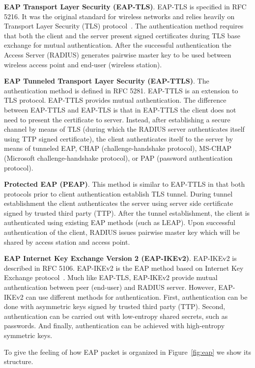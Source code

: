 \textbf{EAP Transport Layer Security (EAP-TLS)}. EAP-TLS is specified in RFC 5216. It was the original standard for wireless networks and relies heavily on Transport Layer Security (TLS) protocol~\cite{tls}. The authentication method requires that both the client and the server present signed certificates during TLS base exchange for mutual authentication. After the successful authentication the Access Server (RADIUS) generates pairwise master key to be used between wireless access point and end-user (wireless station).

\textbf{EAP Tunneled Transport Layer Security (EAP-TTLS)}. The authentication method is defined in RFC 5281. EAP-TTLS is an extension to TLS protocol. EAP-TTLS provides mutual authentication. The difference between EAP-TTLS and EAP-TLS is that in EAP-TTLS the client does not need to present the certificate to server. Instead, after establishing a secure channel by means of TLS (during which the RADIUS server authenticates itself using TTP signed certificate), the client authenticates itself to the server by means of tunneled EAP, CHAP (challenge-handshake protocol), MS-CHAP (Microsoft challenge-handshake protocol), or PAP (password authentication protocol).

\textbf{Protected EAP (PEAP)}. This method is similar to EAP-TTLS in that both protocols prior to client authentication establish TLS tunnel. During tunnel establishment the client authenticates the server using server side certificate signed by trusted third party (TTP). After the tunnel establishment, the client is authenticated using existing EAP methods (such as LEAP). Upon successful authentication of the client, RADIUS issues pairwise master key which will be shared by access station and access point.

\textbf{EAP Internet Key Exchange Version 2 (EAP-IKEv2)}. EAP-IKEv2 is described in RFC 5106. EAP-IKEv2 is the EAP method based on Internet Key Exchange protocol~\cite{}. Much like EAP-TLS, EAP-IKEv2 provide mutual authentication between peer (end-user) and RADIUS server. However, EAP-IKEv2 can use different methods for authentication. First, authentication can be done with asymmetric keys signed by trusted third party (TTP). Second, authentication can be carried out with low-entropy shared secrets, such as passwords. And finally, authentication can be achieved with high-entropy symmetric keys. 

To give the feeling of how EAP packet is organized in Figure~\ref{fig:eap} we show its structure.

